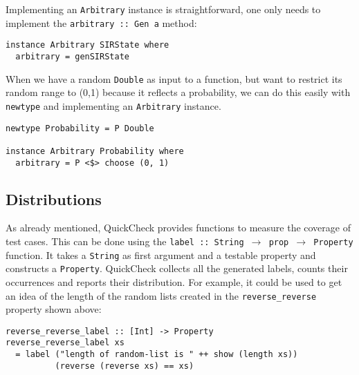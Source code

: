Implementing an \texttt{Arbitrary} instance is straightforward, one only needs to implement the \texttt{arbitrary :: Gen a} method:

\begin{footnotesize}
\begin{verbatim}
instance Arbitrary SIRState where
  arbitrary = genSIRState
\end{verbatim}
\end{footnotesize}

When we have a random \texttt{Double} as input to a function, but want to restrict its random range to (0,1) because it reflects a probability, we can do this easily with \texttt{newtype} and implementing an \texttt{Arbitrary} instance.

\begin{footnotesize}
\begin{verbatim}
newtype Probability = P Double

instance Arbitrary Probability where
  arbitrary = P <$> choose (0, 1)
\end{verbatim}
\end{footnotesize}

\subsection{Distributions}
As already mentioned, QuickCheck provides functions to measure the coverage of test cases. This can be done using the 
\texttt{label :: String $\rightarrow$ prop $\rightarrow$ Property} function. It takes a \texttt{String} as first argument and a testable property and constructs a \texttt{Property}. QuickCheck collects all the generated labels, counts their occurrences and reports their distribution. For example, it could be used to get an idea of the length of the random lists created in the \texttt{reverse\_reverse} property shown above:

\begin{footnotesize}
\begin{verbatim}
reverse_reverse_label :: [Int] -> Property
reverse_reverse_label xs  
  = label ("length of random-list is " ++ show (length xs)) 
          (reverse (reverse xs) == xs)
\end{verbatim}
\end{footnotesize}

